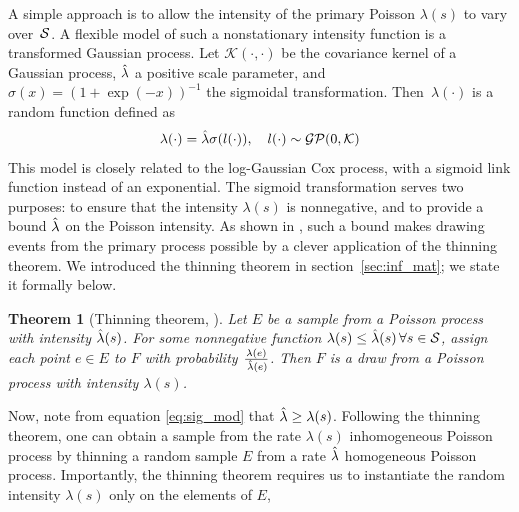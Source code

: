 \documentclass{statsoc}
\newtheorem{thrm}[defn]{Theorem}
\begin{document}
A simple approach is %
to allow the intensity of the primary Poisson $\lambda(s)$ to vary over~${\mathcal S}$. %
A flexible model of such a nonstationary intensity function is a transformed Gaussian process.
Let $\mathcal{K}(\cdot,\cdot)$ be the %
covariance kernel of a Gaussian process, $\hat{\lambda}$ a positive scale parameter, and 
$\sigma(x)=(1+\exp(-x))^{-1}$ the sigmoidal transformation. Then~$\lambda(\cdot)$ is a random function defined as
  \begin{align}
    \lambda(\cdot) = \hat{\lambda} \sigma(l(\cdot)), \quad
    l(\cdot) \sim \mathcal{GP}(0,\mathcal{K})\label{eq:sig_mod}
  \end{align}
  This model is closely related to the log-Gaussian Cox process, with a sigmoid link function instead of an exponential.
The sigmoid transformation serves two purposes: to ensure that the intensity $\lambda(s)$ is nonnegative, and
to provide a bound $\hat{\lambda}$ on the Poisson intensity. As shown in \cite{adams-murray-mackay-2009b}, such a bound makes drawing events from the 
primary process possible by a %
clever application of the thinning theorem. %
We introduced the thinning theorem in section~\ref{sec:inf_mat}; we state it formally below.
\begin{thrm}[Thinning theorem, \cite{Lewis1979}]
 Let $E$ be a sample from a Poisson process with intensity $\hat{\lambda}(s)$.
For some nonnegative function ${\lambda(s) \le \hat{\lambda}(s) \, \forall s \in {\mathcal S}}$, assign each
point $e \in E$ to $F$ with probability $\frac{\lambda(e)}{\, \hat{\lambda}(e)}$.
 Then $F$ is a draw from a Poisson process with intensity $\lambda(s)$. \label{thrm:Thin}
\end{thrm}
Now, note from equation \eqref{eq:sig_mod} that ${\hat{\lambda} \ge \lambda(s)}$. Following the thinning theorem, 
one can obtain a sample from the rate $\lambda(s)$ inhomogeneous Poisson process by thinning a random sample $E$ from a rate $\hat{\lambda}$ homogeneous
Poisson process. Importantly, the thinning theorem requires us to instantiate the random intensity $\lambda(s)$ only on the elements of $E$,
\end{document}
